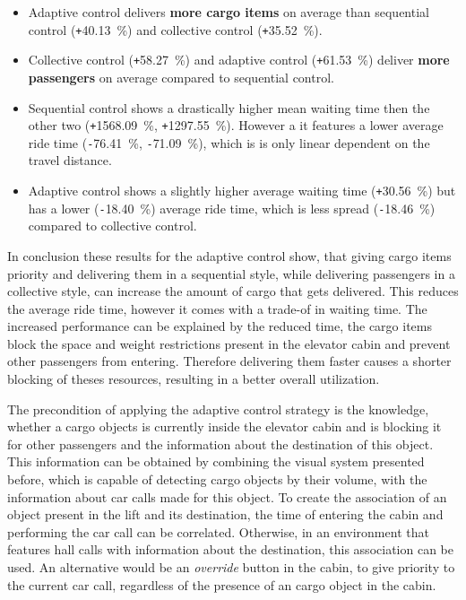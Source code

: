\begin{itemize}
    \item Adaptive control delivers \textbf{more cargo items} on average than sequential control (\texttt{+}40.13~\%) and collective control (\texttt{+}35.52~\%).
    \item Collective control (\texttt{+}58.27~\%) and adaptive control (\texttt{+}61.53~\%) deliver \textbf{more passengers} on average compared to sequential control. 
    \item Sequential control shows a drastically higher mean waiting time then the other two (\texttt{+}1568.09~\%, \texttt{+}1297.55~\%). However a it features a lower average ride time (\texttt{-}76.41~\%, \texttt{-}71.09~\%), which is is only linear dependent on the travel distance.
    \item Adaptive control shows a slightly higher average waiting time (\texttt{+}30.56~\%) but has a lower (\texttt{-}18.40~\%) average ride time, which is less spread (\texttt{-}18.46~\%) compared to collective control.
\end{itemize}

In conclusion these results for the adaptive control show, that giving cargo items priority and delivering them in a sequential style, while delivering passengers in a collective style, 
can increase the amount of cargo that gets delivered. 
This reduces the average ride time, however it comes with a trade-of in waiting time.
The increased performance can be explained by the reduced time, the cargo items block the space and weight restrictions present in the elevator cabin and prevent other passengers from entering.
Therefore delivering them faster causes a shorter blocking of theses resources, resulting in a better overall utilization.

The precondition of applying the adaptive control strategy is the knowledge, 
whether a cargo objects is currently inside the elevator cabin and is blocking it for other passengers 
and the information about the destination of this object.
This information can be obtained by combining the visual system presented before, which is capable of detecting cargo objects by their volume, with the information about car calls made for this object. To create the association of an object present in the lift and its destination, 
the time of entering the cabin and performing the car call can be correlated.
Otherwise, in an environment that features hall calls with information about the destination, this association can be used.
An alternative would be an \emph{override} button in the cabin, 
to give priority to the current car call, regardless of the presence of an cargo object in the cabin.

